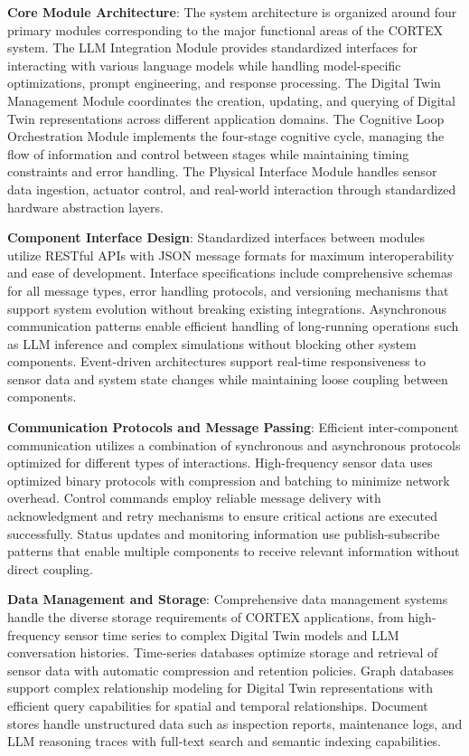 \textbf{Core Module Architecture}: The system architecture is organized around four primary modules corresponding to the major functional areas of the CORTEX system. The LLM Integration Module provides standardized interfaces for interacting with various language models while handling model-specific optimizations, prompt engineering, and response processing. The Digital Twin Management Module coordinates the creation, updating, and querying of Digital Twin representations across different application domains. The Cognitive Loop Orchestration Module implements the four-stage cognitive cycle, managing the flow of information and control between stages while maintaining timing constraints and error handling. The Physical Interface Module handles sensor data ingestion, actuator control, and real-world interaction through standardized hardware abstraction layers.

\textbf{Component Interface Design}: Standardized interfaces between modules utilize RESTful APIs with JSON message formats for maximum interoperability and ease of development. Interface specifications include comprehensive schemas for all message types, error handling protocols, and versioning mechanisms that support system evolution without breaking existing integrations. Asynchronous communication patterns enable efficient handling of long-running operations such as LLM inference and complex simulations without blocking other system components. Event-driven architectures support real-time responsiveness to sensor data and system state changes while maintaining loose coupling between components.

\textbf{Communication Protocols and Message Passing}: Efficient inter-component communication utilizes a combination of synchronous and asynchronous protocols optimized for different types of interactions. High-frequency sensor data uses optimized binary protocols with compression and batching to minimize network overhead. Control commands employ reliable message delivery with acknowledgment and retry mechanisms to ensure critical actions are executed successfully. Status updates and monitoring information use publish-subscribe patterns that enable multiple components to receive relevant information without direct coupling.

\textbf{Data Management and Storage}: Comprehensive data management systems handle the diverse storage requirements of CORTEX applications, from high-frequency sensor time series to complex Digital Twin models and LLM conversation histories. Time-series databases optimize storage and retrieval of sensor data with automatic compression and retention policies. Graph databases support complex relationship modeling for Digital Twin representations with efficient query capabilities for spatial and temporal relationships. Document stores handle unstructured data such as inspection reports, maintenance logs, and LLM reasoning traces with full-text search and semantic indexing capabilities.

